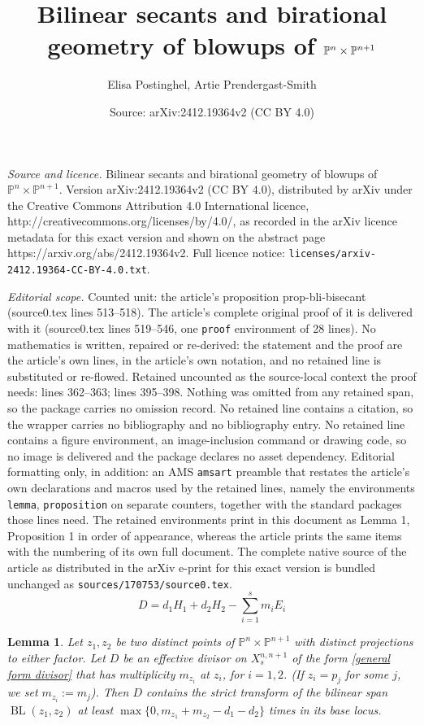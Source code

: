 \documentclass[10pt,a4paper]{amsart}
\title{Bilinear secants and birational geometry of blowups of $\PP^n \times \PP^{n+1}$}
\author{Elisa Postinghel, Artie Prendergast-Smith}
\date{Source: arXiv:2412.19364v2 (CC BY 4.0)}
\newcommand{\PP}{\mathbb P}
\newtheorem{lemma}{Lemma}
\newcommand{\BL}{\operatorname{BL}}
\newcommand{\ourproduct}{\mathbb P^n \times \mathbb P^{n+1}}
\newcommand{\ourproductblowup}[1]{X^{n,n+1}_{#1}}
\begin{document}
\maketitle

\noindent\emph{Source and licence.} Bilinear secants and birational geometry of blowups of $\PP^n \times \PP^{n+1}$. Version arXiv:2412.19364v2 (CC BY 4.0), distributed by arXiv under the Creative Commons Attribution 4.0 International licence, http://creativecommons.org/licenses/by/4.0/, as recorded in the arXiv licence metadata for this exact version and shown on the abstract page https://arxiv.org/abs/2412.19364v2. Full licence notice: \texttt{licenses/arxiv-2412.19364-CC-BY-4.0.txt}.\par\smallskip

\noindent\textit{Editorial scope.} Counted unit: the article's proposition prop-bli-bisecant (source0.tex lines 513--518). The article's complete original proof of it is delivered with it (source0.tex lines 519--546, one \texttt{proof} environment of 28 lines). No mathematics is written, repaired or re-derived: the statement and the proof are the article's own lines, in the article's own notation, and no retained line is substituted or re-flowed.  Retained uncounted as the source-local context the proof needs: lines 362--363; lines 395--398.  Nothing was omitted from any retained span, so the package carries no omission record.  No retained line contains a citation, so the wrapper carries no bibliography and no bibliography entry.  No retained line contains a figure environment, an image-inclusion command or drawing code, so no image is delivered and the package declares no asset dependency.  Editorial formatting only, in addition: an AMS \texttt{amsart} preamble that restates the article's own declarations and macros used by the retained lines, namely the environments \texttt{lemma}, \texttt{proposition} on separate counters, together with the standard packages those lines need.  The retained environments print in this document as Lemma 1, Proposition 1 in order of appearance, whereas the article prints the same items with the numbering of its own full document.  The complete native source of the article as distributed in the arXiv e-print for this exact version is bundled unchanged as \texttt{sources/170753/source0.tex}.
\begin{equation}\label{general form divisor}
D=d_1H_1+d_2H_2-\sum_{i=1}^sm_iE_i\end{equation}

\begin{lemma}\label{recipe-BLI-bilinear joins}
 Let $z_1,z_2$ be two distinct points of $\ourproduct$ with distinct projections to either factor. 
 Let $D$ be an effective divisor on $\ourproductblowup{s}$ of the form \eqref{general form divisor} that has multiplicity $m_{z_i}$ at $z_i$, for $i=1,2$. (If $z_i=p_j$ for some $j$, we set $m_{z_i}:=m_j$). Then $D$ contains the strict transform of the bilinear span $\BL(z_1,z_2)$ at least $\max\{0,m_{z_1}+m_{z_2}-d_1-d_2\}$ times in its base locus.
\end{lemma}
\end{document}

